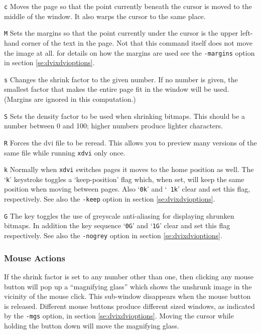 \begin{list}
\item[\tt c]
Moves the page so that the point currently beneath the cursor is moved to
the middle of the window.  It also warps the cursor to the same place.

\item[\tt M]
Sets the margins so that the point currently under the cursor is the upper
left-hand corner of the text in the page. Not that this command itself does not
move the image at all. for details on how the margins are used see the
{\tt-margins} option in section \ref{se:dvixdvioptions}.

\item[\tt s]
Changes the shrink factor to the given number.  If no number is given, the
smallest factor that makes the entire page fit in the window will be used.
(Margins are ignored in this computation.)

\item[\tt S]
Sets the density factor to be used when shrinking bitmaps.  This should
be a number between 0 and 100; higher numbers produce lighter characters.

\item[\tt R]
Forces the dvi file to be reread.  This allows you to preview many versions
of the same file while running \verb+xdvi+ only once.

\item[\tt k]
Normally when \verb+xdvi+ switches pages it moves to the home position as well.
The `{\tt k}' keystroke toggles a `keep-position' flag which, when set, will
keep the same position when moving between pages.  Also `{\tt 0k}' and `{\tt
1k}' clear and set this flag, respectively. See also the {\tt-keep} option in
section \ref{se:dvixdvioptions}.

\item[\tt G]
The key toggles the use of greyscale anti-aliasing for displaying shrunken
bitmaps. In addition the key sequence `{\tt 0G}' and `{\tt 1G}' clear and set
this flag respectively. See also the {\tt-nogrey} option in section
\ref{se:dvixdvioptions}. 
\end{list}


\subsubsection{Mouse Actions}
\label{se:dvixdvimouse}
If the shrink factor is set to any number other than one, then clicking
any mouse button will pop up a ``magnifying glass'' which shows the unshrunk
image in the vicinity of the mouse click.  This sub-window disappears when
the mouse button is released.  Different mouse buttons produce different sized
windows, as indicated by the {\tt -mgs} option, in section
\ref{se:dvixdvioptions}.  Moving the cursor
while holding the button down will move the magnifying glass.

